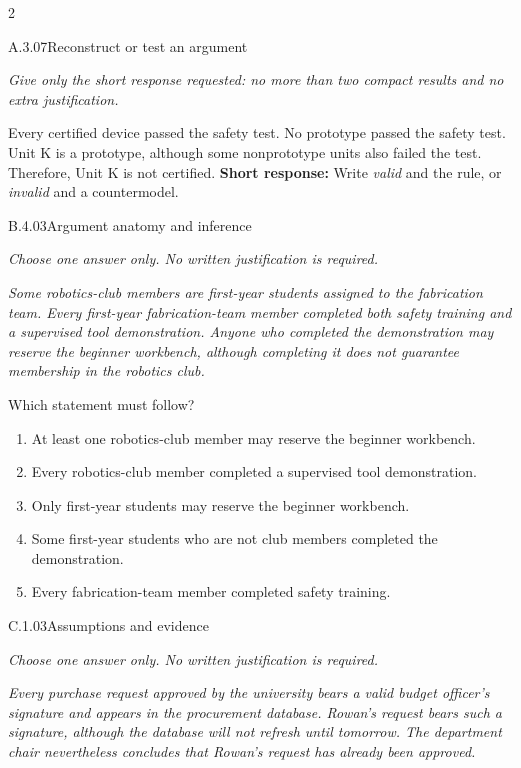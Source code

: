 \documentclass[9pt]{extarticle}
\newcommand{\choice}[1]{\item #1}
\begin{document}
\begin{multicols}{2}
\begin{DenseCoreProblem}{A.3.07}{Reconstruct or test an argument}
{\scriptsize\textit{Give only the short response requested: no more than two compact results and no extra justification.}\par}
Every certified device passed the safety test. No prototype passed the safety test. Unit K is a prototype, although some nonprototype units also failed the test. Therefore, Unit K is not certified.
\textbf{Short response:} Write \emph{valid} and the rule, or \emph{invalid} and a countermodel.
\end{DenseCoreProblem}
\begin{DenseCoreProblem}{B.4.03}{Argument anatomy and inference}
{\scriptsize\textit{Choose one answer only. No written justification is required.}\par}
\emph{Some robotics-club members are first-year students assigned to the fabrication team. Every first-year fabrication-team member completed both safety training and a supervised tool demonstration. Anyone who completed the demonstration may reserve the beginner workbench, although completing it does not guarantee membership in the robotics club.}

Which statement must follow?
\begin{enumerate}[label=(\alph*)]
  \choice{At least one robotics-club member may reserve the beginner workbench.}
  \choice{Every robotics-club member completed a supervised tool demonstration.}
  \choice{Only first-year students may reserve the beginner workbench.}
  \choice{Some first-year students who are not club members completed the demonstration.}
  \choice{Every fabrication-team member completed safety training.}
\end{enumerate}
\end{DenseCoreProblem}
\columnbreak
\begin{DenseCoreProblem}{C.1.03}{Assumptions and evidence}
{\scriptsize\textit{Choose one answer only. No written justification is required.}\par}
\emph{Every purchase request approved by the university bears a valid budget officer's signature and appears in the procurement database. Rowan's request bears such a signature, although the database will not refresh until tomorrow. The department chair nevertheless concludes that Rowan's request has already been approved.}


\end{DenseCoreProblem}
\end{multicols}
\end{document}
